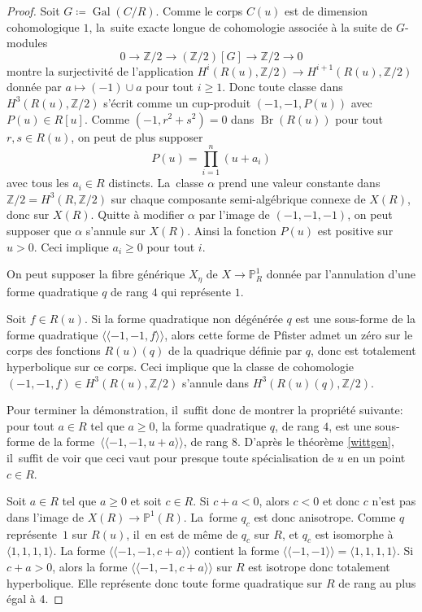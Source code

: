 \documentclass[JEP,XML,SOM,Unicode,francais,published]{cedram}
\theoremstyle{definition}
\newcommand{\Z}{\mathbb Z}
\renewcommand{\P}{\mathbb P}
\newcommand{\on}[1]{\operatorname{#1}}
\begin{document}
\begin{proof}
Soit $G\coloneqq \on{Gal}(C/R)$. Comme le corps $C(u)$ est de dimension cohomologique $1$, la~suite exacte longue de cohomologie associée à la suite de $G$-modules \[0\to \Z/2\to (\Z/2)[G]\to \Z/2\to 0\] montre la surjectivité de l'application $H^i(R(u),\Z/2)\to H^{i+1}(R(u),\Z/2)$ donnée par $a\mapsto (-1)\cup a$ pour tout $i\geq 1$. Donc toute classe dans $H^3(R(u),\Z/2)$ s'écrit
comme un cup-produit $(-1,-1,P(u))$ avec $P(u)\in R[u]$. Comme $(-1,r^2+s^2)=0$ dans $\on{Br}(R(u))$ pour tout $r,s\in R(u)$, on peut de plus supposer
\[
P(u) = \prod_{i=1}^n (u+a_{i})
\]
avec tous les $a_{i} \in R$ distincts. La~classe $\alpha$ prend une valeur constante dans $\Z/2= H^3(R, \Z/2)$ sur chaque composante semi-algébrique connexe de $X(R)$, donc sur $X(R)$. Quitte à modifier $\alpha$ par l'image de $(-1,-1,-1)$, on peut supposer que $\alpha$ s'annule sur $X(R)$. Ainsi la fonction $P(u) $ est positive sur $u>0$. Ceci implique $a_{i} \geq 0$ pour tout $i$.

On peut supposer la fibre générique $X_{\eta}$ de $X\to \P^1_R$ donnée par l'annulation d'une forme quadratique $q$ de rang $4$ qui représente $1$.

Soit $f\in R(u)$.
Si la forme quadratique non dégénérée $q$ est une sous-forme de la forme quadratique
$\langle \!\langle -1,-1, f\rangle \!\rangle $, alors cette forme de Pfister admet un zéro sur le corps des fonctions
$R(u)(q)$ de la quadrique définie par $q$, donc est totalement hyperbolique sur
ce corps. Ceci implique que la classe de cohomologie $(-1,-1,f) \in H^3(R(u),\Z/2)$
s'annule dans $H^3(R(u)(q),\Z/2)$.

Pour terminer la démonstration, il~suffit donc de montrer la propriété suivante:
pour tout $a\!\in\! R$ tel que $a \!\geq\!0$, la forme quadratique $q$, de rang $4$,
est une sous-forme de la forme~\hbox{$\!\langle \!\langle -1,-1, u+a \rangle \!\rangle$}, de rang 8.
D'après le théorème \ref{wittgen}, il~suffit de voir
que ceci vaut pour presque toute spécialisation de $u$
en un point $c\in R$.

Soit $a\in R$ tel que $a\geq 0$ et soit $c\in R$.
Si $c+a <0$, alors $c<0$ et donc $c$ n'est pas dans l'image de
$X(R) \to \P^1(R)$. La~forme $q_{c}$ est donc anisotrope.
Comme $q$ représente~$1$ sur $R(u)$, il~en est de même de $q_{c}$ sur $R$,
et $q_{c}$ est isomorphe à $\langle 1,1,1,1\rangle $.
La forme $\langle \!\langle-1,-1, c+a \rangle \!\rangle$ contient la forme
$\langle \!\langle -1,-1 \rangle \!\rangle=\langle 1,1,1,1 \rangle$. Si $c+a>0$, alors la forme $\langle \!\langle -1,-1, c+a\rangle \!\rangle$ sur $R$ est isotrope donc totalement
hyperbolique. Elle représente donc toute forme quadratique sur $R$
de rang au plus égal à $4$.


\end{proof}
\end{document}
